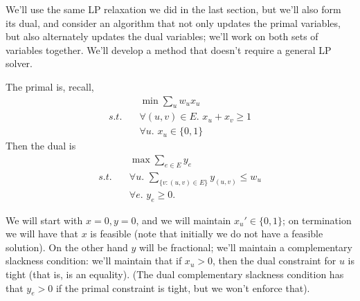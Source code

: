 \documentclass{article}
\begin{document}
We'll use the same LP relaxation we did in the last section, but we'll also
form its dual, and consider an algorithm that not only updates the
primal variables, but also alternately updates the dual variables; we'll
work on both sets of variables together. We'll develop a method that doesn't
require a general LP solver.

The primal is, recall,
\begin{align}
& \min \sum_u w_u x_u \\
s.t.\quad & \forall (u,v)\in E.\,\, x_u + x_v \geq 1 \\
& \forall u.\,\, x_u \in \{0,1\}
\end{align}
Then the dual is
\begin{align}
& \max \sum_{e\in E} y_e \\
s.t.\quad & \forall u.\,\, \sum_{\{v : (u,v)\in E\}} y_{(u,v)} \leq w_u \\
& \forall e.\,\, y_e \geq 0.
\end{align}

We will start with $x=0, y=0$, and we will maintain $x_u'\in\{0,1\}$;
on termination we will have that $x$ is feasible (note that initially
we do not have a feasible solution).
On the other hand $y$ will be fractional; we'll maintain a complementary
slackness condition: we'll maintain that if $x_u > 0$, then the dual
constraint for $u$ is tight (that is, is an equality).
(The dual complementary slackness condition has that $y_e > 0$ if the
primal constraint is tight, but we won't enforce that).
\end{document}
